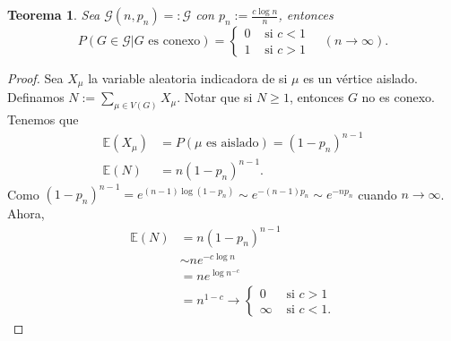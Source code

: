 \documentclass[12pt]{report}
\theoremstyle{plain}
\newtheorem{theorem}{Teorema}[section]
\theoremstyle{definition}
\begin{document}
\begin{theorem}
Sea $\mathcal G (n, p_n) =: \mathcal G$ con $p_n := \frac{c \log n}{n}$, entonces
\[
    P ( G \in \mathcal G | G \text{ es conexo}) = \begin{cases}
    0 & \text{ si $c < 1$} \\
    1 & \text{ si $c > 1$}
    \end{cases} \quad (n \to \infty).
\]
\end{theorem}
\begin{proof}
Sea $X_\mu$ la variable aleatoria indicadora de si $\mu$ es un vértice aislado. Definamos $N := \sum_{\mu \in V(G)} X_\mu$. Notar que si $N \geq 1$, entonces $G$ no es conexo. Tenemos que
\begin{align*}
\mathbb{E} (X_\mu) &= P ( \mu \text{ es aislado}) = (1- p_n)^{n-1} \\
\mathbb{E} (N) &= n (1-p_n)^{n-1}.
\end{align*}
Como $(1-p_n)^{n-1} = e^{(n-1) \log (1- p_n)} \sim e^{-(n-1) p_n} \sim e^{-n p_n}$ cuando $n \to \infty$. Ahora,
\begin{align*}
\mathbb{E} (N) &= n (1-p_n)^{n-1} \\
&\sim n e^{- c \log n} \\
&= n e^{\log n^{-c}} \\
&= n^{1-c} \longrightarrow \begin{cases}
0 & \text{ si $c > 1$} \\
\infty & \text{ si $c < 1$}.
\end{cases}
\end{align*}


\end{proof}
\end{document}
